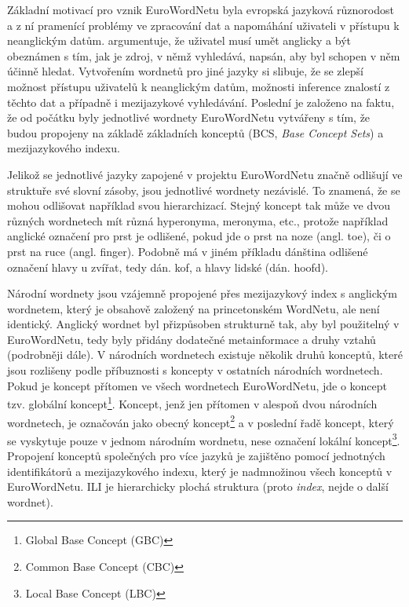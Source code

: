 \documentclass[a4paper, 11pt, oneside]{book}
\newcommand\ex{\textsf}
\begin{document}
				Základní motivací pro vznik EuroWordNetu byla evropská jazyková různorodost a z ní pramenící problémy ve zpracování dat a napomáhání uživateli v přístupu k neanglickým datům. \textcite{vossen1997eurowordnet} argumentuje, že uživatel musí umět anglicky a být obeznámen s tím, jak je zdroj, v němž vyhledává, napsán, aby byl schopen v něm účinně hledat. Vytvořením wordnetů pro jiné jazyky si slibuje, že se zlepší možnost přístupu uživatelů k neanglickým datům, možnosti inference znalostí z těchto dat a případně i mezijazykové vyhledávání. Poslední je založeno na faktu, že od počátku byly jednotlivé wordnety EuroWordNetu vytvářeny s tím, že budou propojeny na základě základních konceptů (BCS, \textit{Base Concept Sets}) a mezijazykového indexu.

				Jelikož se jednotlivé jazyky zapojené v projektu EuroWordNetu značně odlišují ve struktuře své slovní zásoby, jsou jednotlivé wordnety nezávislé. To znamená, že se mohou odlišovat například svou hierarchizací. Stejný koncept tak může ve dvou různých wordnetech mít různá hyperonyma, meronyma, etc., protože například anglické označení pro \ex{prst} je odlišené, pokud jde o \ex{prst na noze} (angl. \ex{toe}), či o prst na ruce (angl. \ex{finger}). Podobně má v jiném příkladu dánština odlišené označení \ex{hlavy u zvířat}, tedy dán. \ex{kof}, a hlavy lidské (dán. \ex{hoofd}). \parencite{vossen1997eurowordnet}

				Národní wordnety jsou vzájemně propojené přes mezijazykový index s anglickým wordnetem, který je obsahově založený na princetonském WordNetu, ale není identický. Anglický wordnet byl přizpůsoben strukturně tak, aby byl použitelný v EuroWordNetu, tedy byly přidány dodatečné metainformace a druhy vztahů (podrobněji dále). V národních wordnetech existuje několik druhů konceptů, které jsou rozlišeny podle příbuznosti s koncepty v ostatních národních wordnetech. Pokud je koncept přítomen ve všech wordnetech EuroWordNetu, jde o koncept tzv. globální koncept\footnote{Global Base Concept (GBC)}. Koncept, jenž jen přítomen v alespoň dvou národních wordnetech, je označován jako obecný koncept\footnote{Common Base Concept (CBC)} a v poslední řadě koncept, který se vyskytuje pouze v jednom národním wordnetu, nese označení lokální koncept\footnote{Local Base Concept (LBC)}. \parencite{gwa2013baseconcepts} Propojení konceptů společných pro více jazyků je zajištěno pomocí jednotných identifikátorů a mezijazykového indexu, který je nadmnožinou všech konceptů v EuroWordNetu. ILI je hierarchicky plochá struktura (proto \textit{index}, nejde o další  wordnet). \parencite{vossen1997eurowordnet}
\end{document}
